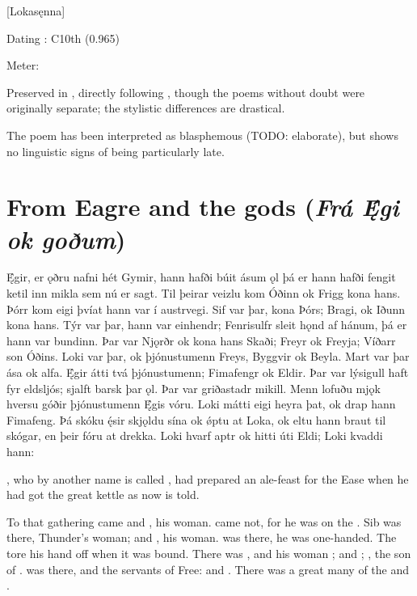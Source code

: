 [Lokasęnna]

\begin{flushright}%
Dating \parencite{Sapp2022}: C10th (0.965)

Meter: \Ljodahattr%
\end{flushright}

Preserved in \Regius, directly following \Hymiskvida, though the poems without doubt were originally separate; the stylistic differences are drastical.

The poem has been interpreted as blasphemous (TODO: elaborate), but shows no linguistic signs of being particularly late.

\sectionline

\section{From Eagre and the gods (\emph{Frá Ę́gi ok goðum})}

\bpg\bpa Ę́gir, er ǫðru nafni hét Gymir, hann hafði búit ásum ǫl þá er hann hafði fengit ketil inn mikla sem nú er sagt. Til þeirar veizlu kom Óðinn ok Frigg kona hans. Þórr kom eigi þvíat hann var í austrvegi. Sif var þar, kona Þórs; Bragi, ok Iðunn kona hans. Týr var þar, hann var einhendr; Fenrisulfr sleit hǫnd af hánum, þá er hann var bundinn. Þar var Njǫrðr ok kona hans Skaði; Freyr ok Freyja; Víðarr son Óðins. Loki var þar, ok þjónustumenn Freys, Byggvir ok Beyla. Mart var þar ása ok alfa. Ę́gir átti tvá þjónustumenn; Fimafengr ok Eldir. Þar var lýsigull haft fyr eldsljós; sjalft barsk þar ǫl. Þar var griðastadr mikill. Menn lofuðu mjǫk hversu góðir þjónustumenn Ę́gis vóru. Loki mátti eigi heyra þat, ok drap hann Fimafeng. Þá skóku ę́sir skjǫldu sína ok ǿptu at Loka, ok eltu hann braut til skógar, en þeir fóru at drekka. Loki hvarf aptr ok hitti úti Eldi; Loki kvaddi hann:\epa

\bpb {}, who by another name is called , had prepared an ale-feast for the Ease when he had got the great kettle as now is told.

To that gathering came  and , his woman.  came not, for he was on the . Sib was there, Thunder’s woman;  and , his woman.  was there, he was one-handed. The  tore his hand off when it was bound. There was , and his woman ;  and ; , the son of .  was there, and the servants of Free:  and . There was a great many of the  and .

